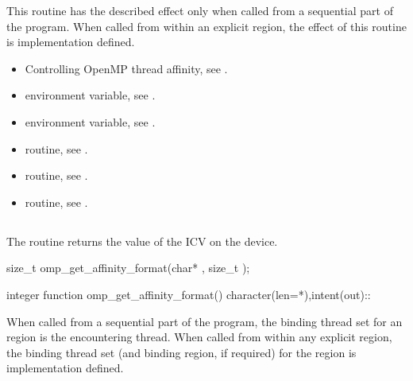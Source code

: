 This routine has the described effect only when called from a sequential part of the 
program. When called from within an explicit  region, the effect of this 
routine is implementation defined.

\crossreferences
\begin{itemize}
\item Controlling OpenMP thread affinity, see 
. 
\item {} environment variable, see 
.
\item {} environment variable, see 
.
\item {} routine, see .
\item {} routine, see .
\item {} routine, see .
\end{itemize}

\subsection{}
\label{subsec:omp_get_affinity_format}

\summary
The  routine returns the value of the 
 ICV on the device.

\format
\begin{ccppspecific}
\begin{boxedcode}
size_t omp\_get\_affinity\_format(char* , size_t );
\end{boxedcode}
\end{ccppspecific}

\begin{fortranspecific}
\begin{boxedcode}
integer function omp\_get\_affinity\_format()
character(len=*),intent(out)::
\end{boxedcode}
\end{fortranspecific}

\binding
When called from a sequential part of the program, the binding thread set for an 
 region is the encountering thread. When called 
from within any explicit  region, the binding thread set (and binding region, if 
required) for the  region is implementation defined. 

